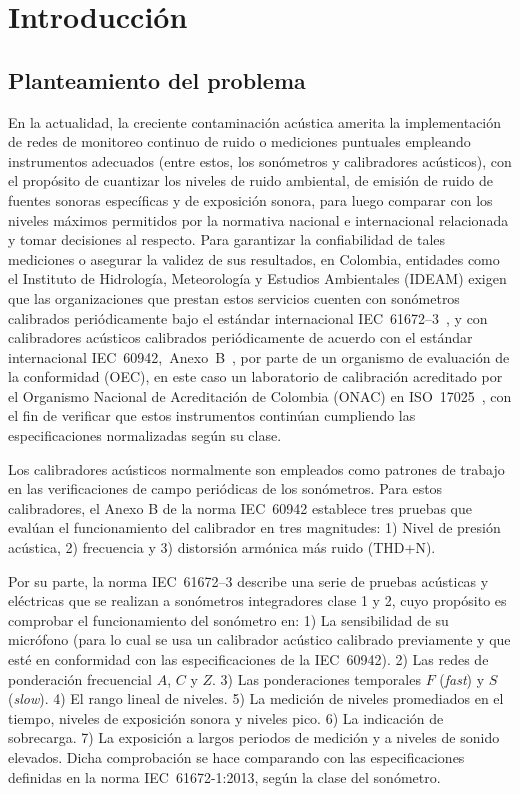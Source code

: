 \chapter{Introducción}

\section{Planteamiento del problema}
En la actualidad, la creciente contaminación acústica amerita la implementación de redes de monitoreo continuo de ruido
o mediciones puntuales empleando instrumentos adecuados (entre estos, los sonómetros y calibradores acústicos), con el
propósito de cuantizar los niveles de ruido ambiental, de emisión de ruido de fuentes sonoras específicas y de
exposición sonora, para luego comparar con los niveles máximos permitidos por la normativa nacional e internacional
relacionada y tomar decisiones al respecto.
Para garantizar la confiabilidad de tales mediciones o asegurar la validez de sus resultados, en Colombia, entidades
como el Instituto de Hidrología, Meteorología y Estudios Ambientales (IDEAM) exigen que las organizaciones que prestan
estos servicios cuenten con sonómetros calibrados periódicamente bajo el estándar internacional
\mbox{IEC 61672--3}~\citeyearpar{IEC_TC29_2013_3}, y con calibradores acústicos calibrados periódicamente de acuerdo con
el estándar internacional \mbox{IEC 60942, Anexo B}~\citeyearpar{IEC_TC29_2017}, por parte de un organismo de evaluación
de la conformidad (OEC), en este caso un laboratorio de calibración acreditado por el Organismo Nacional de Acreditación
de Colombia (ONAC) en \mbox{ISO 17025}~\citeyearpar{ISO_CASCO_2017}, con el fin de verificar que estos instrumentos
continúan cumpliendo las especificaciones normalizadas según su clase.

Los calibradores acústicos normalmente son empleados como patrones de trabajo en las verificaciones de campo periódicas
de los sonómetros.
Para estos calibradores, el Anexo B de la norma \mbox{IEC 60942} establece tres pruebas que evalúan el funcionamiento
del calibrador en tres magnitudes:
1) Nivel de presión acústica,
2) frecuencia y
3) distorsión armónica más ruido (THD+N).

Por su parte, la norma \mbox{IEC 61672--3} describe una serie de pruebas acústicas y eléctricas que se realizan a
sonómetros integradores clase 1 y 2, cuyo propósito es comprobar el funcionamiento del sonómetro en:
1) La sensibilidad de su micrófono (para lo cual se usa un calibrador acústico calibrado previamente y que esté en
conformidad con las especificaciones de la \mbox{IEC 60942}).
2) Las redes de ponderación frecuencial $A$, $C$ y $Z$.
3) Las ponderaciones temporales $F$ (\emph{fast}) y $S$ (\emph{slow}).
4) El rango lineal de niveles.
5) La medición de niveles promediados en el tiempo, niveles de exposición sonora y niveles pico.
6) La indicación de sobrecarga.
7) La exposición a largos periodos de medición y a niveles de sonido elevados.
Dicha comprobación se hace comparando con las especificaciones definidas en la norma \mbox{IEC 61672-1:2013}, según la
clase del sonómetro.

